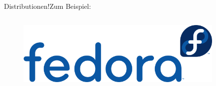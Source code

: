 \begin{frame}{Distributionen!}{Zum Beispiel:}
\begin{columns}
\begin{column}{0.5\textwidth}
\begin{figure}
\includegraphics[width=0.9\textwidth]{resources/640px-Fedora_logo_and_wordmark}
\end{figure}

\end{column}
\end{columns}
\end{frame}

